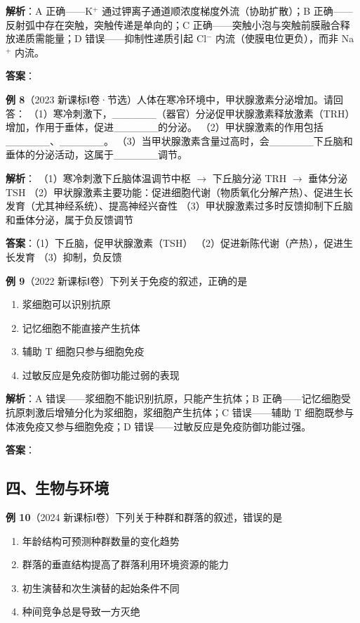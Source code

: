 \textbf{解析}：A 正确——K$^+$ 通过钾离子通道顺浓度梯度外流（协助扩散）；B 正确——反射弧中存在突触，突触传递是单向的；C 正确——突触小泡与突触前膜融合释放递质需能量；D 错误——抑制性递质引起 Cl$^-$ 内流（使膜电位更负），而非 Na$^+$ 内流。

\textbf{答案}：

\textbf{例 8}（2023 新课标Ⅰ卷·节选）人体在寒冷环境中，甲状腺激素分泌增加。请回答：
（1）寒冷刺激下，\_\_\_\_\_\_（器官）分泌促甲状腺激素释放激素（TRH）增加，作用于垂体，促进\_\_\_\_\_\_的分泌。
（2）甲状腺激素的作用包括\_\_\_\_\_\_、\_\_\_\_\_\_。
（3）当甲状腺激素含量过高时，会\_\_\_\_\_\_下丘脑和垂体的分泌活动，这属于\_\_\_\_\_\_调节。

\textbf{解析}：
（1）寒冷刺激下丘脑体温调节中枢 $\to$ 下丘脑分泌 TRH $\to$ 垂体分泌 TSH
（2）甲状腺激素主要功能：促进细胞代谢（物质氧化分解产热）、促进生长发育（尤其神经系统）、提高神经兴奋性
（3）甲状腺激素过多时反馈抑制下丘脑和垂体分泌，属于负反馈调节

\textbf{答案}：（1）下丘脑，促甲状腺激素（TSH） （2）促进新陈代谢（产热），促进生长发育 （3）抑制，负反馈

\textbf{例 9}（2022 新课标Ⅰ卷）下列关于免疫的叙述，正确的是
\begin{enumerate}
  \item[A.] 浆细胞可以识别抗原
  \item[B.] 记忆细胞不能直接产生抗体
  \item[C.] 辅助 T 细胞只参与细胞免疫
  \item[D.] 过敏反应是免疫防御功能过弱的表现
\end{enumerate}

\textbf{解析}：A 错误——浆细胞不能识别抗原，只能产生抗体；B 正确——记忆细胞受抗原刺激后增殖分化为浆细胞，浆细胞产生抗体；C 错误——辅助 T 细胞既参与体液免疫又参与细胞免疫；D 错误——过敏反应是免疫防御功能过强。

\textbf{答案}：

\subsection{四、生物与环境}

\textbf{例 10}（2024 新课标Ⅰ卷）下列关于种群和群落的叙述，错误的是
\begin{enumerate}
  \item[A.] 年龄结构可预测种群数量的变化趋势
  \item[B.] 群落的垂直结构提高了群落利用环境资源的能力
  \item[C.] 初生演替和次生演替的起始条件不同
  \item[D.] 种间竞争总是导致一方灭绝
\end{enumerate}

